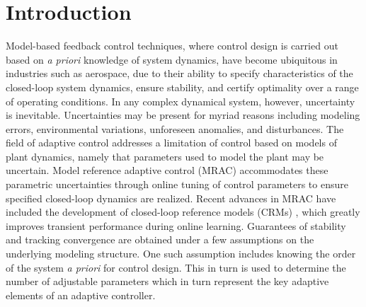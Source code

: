 \chapter{Introduction} \label{sec:introduction}

Model-based feedback control techniques, where control design is carried out based on \textit{a priori} knowledge of system dynamics, have become ubiquitous in industries such as aerospace, due to their ability to specify characteristics of the closed-loop system dynamics, ensure stability, and certify optimality over a range of operating conditions. In any complex dynamical system, however, uncertainty is inevitable. Uncertainties may be present for myriad reasons including modeling errors, environmental variations, unforeseen anomalies, and disturbances. The field of adaptive control addresses a limitation of control based on models of plant dynamics, namely that parameters used to model the plant may be uncertain. Model reference adaptive control (MRAC) \cite{narendra2012stable, lavretsky2013robust} accommodates these parametric uncertainties through online tuning of control parameters to ensure specified closed-loop dynamics are realized. Recent advances in MRAC have included the development of closed-loop reference models (CRMs) \cite{gibson2013adaptive}, which greatly improves transient performance during online learning. Guarantees of stability and tracking convergence are obtained under a few assumptions on the underlying modeling structure. One such assumption includes knowing the order of the system \textit{a priori} for control design. This in turn is used to determine the number of adjustable parameters which in turn represent the key adaptive elements of an adaptive controller.

